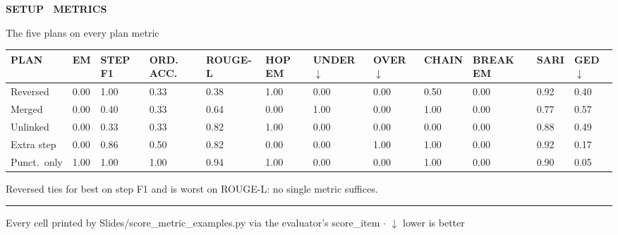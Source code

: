 \documentclass[aspectratio=169,11pt]{beamer}
\providecommand{\textls}[2][]{#2}
\newcommand{\lsp}[1]{\textls[140]{#1}}
\newcommand{\slidehead}[2]{%
  {\color{accent}\fontsize{6.8}{8}\selectfont\bfseries\lsp{#1}\par}%
  \vspace{2.4mm}%
  {\color{ink}\fontsize{15}{18}\selectfont #2\par}%
  \vspace{3.4mm}%
}
\newcommand{\thinrule}[1]{\noindent\textcolor{#1}{\rule{\linewidth}{0.4pt}}\par}
\newcommand{\srcline}[1]{%
  \vfill\thinrule{rulec}\vspace{1.5mm}%
  {\color{muted}\fontsize{6.6}{8}\selectfont #1\par}}
\newcommand{\calloutbg}[3]{%
  \par\vspace{2.6mm}%
  \begin{lrbox}{\cobox}%
    \begin{minipage}{\dimexpr\linewidth-9mm\relax}%
      \color{inktwo}\footnotesize #3%
    \end{minipage}%
  \end{lrbox}%
  \noindent{\setlength{\fboxsep}{0pt}%
    \colorbox{#1}{\raisebox{0pt}[\dimexpr\ht\cobox+2.2mm\relax][\dimexpr\dp\cobox+2.2mm\relax]{\rule{1.6pt}{0pt}}}%
    \colorbox{#2}{\raisebox{0pt}[\dimexpr\ht\cobox+2.2mm\relax][\dimexpr\dp\cobox+2.2mm\relax]{\hspace{3mm}\usebox{\cobox}\hspace{3mm}}}}%
  \par\vspace{2.6mm}%
}
\newcommand{\callout}[1]{\calloutbg{accent}{sunk}{#1}}
\newcommand{\colhead}[1]{{\color{accent}\fontsize{6.5}{8}\selectfont\bfseries\lsp{#1}}}
\begin{document}
\begin{frame}[t]
\slidehead{SETUP \textperiodcentered\ METRICS}{The five plans on every plan metric}
\footnotesize
{\setlength{\tabcolsep}{2pt}%
\begin{tabular}{@{}p{20mm}*{3}{R{9.4mm}}R{11mm}*{7}{R{9.4mm}}@{}}
\colhead{PLAN} & \colhead{EM} & \colhead{STEP F1} & \colhead{ORD. ACC.} & \colhead{\mbox{ROUGE-L}}
 & \colhead{HOP EM} & \colhead{UNDER $\downarrow$} & \colhead{OVER $\downarrow$} & \colhead{CHAIN}
 & \colhead{BREAK EM} & \colhead{SARI} & \colhead{GED $\downarrow$}\\
\midrule
Reversed & \textcolor{inktwo}{0.00} & \textcolor{inktwo}{1.00} & \textcolor{inktwo}{0.33} & \textcolor{inktwo}{0.38} & \textcolor{inktwo}{1.00} & \textcolor{inktwo}{0.00} & \textcolor{inktwo}{0.00} & \textcolor{inktwo}{0.50} & \textcolor{inktwo}{0.00} & \textcolor{inktwo}{0.92} & \textcolor{inktwo}{0.40}\\
Merged & \textcolor{inktwo}{0.00} & \textcolor{inktwo}{0.40} & \textcolor{inktwo}{0.33} & \textcolor{inktwo}{0.64} & \textcolor{inktwo}{0.00} & \textcolor{inktwo}{1.00} & \textcolor{inktwo}{0.00} & \textcolor{inktwo}{1.00} & \textcolor{inktwo}{0.00} & \textcolor{inktwo}{0.77} & \textcolor{inktwo}{0.57}\\
Unlinked & \textcolor{inktwo}{0.00} & \textcolor{inktwo}{0.33} & \textcolor{inktwo}{0.33} & \textcolor{inktwo}{0.82} & \textcolor{inktwo}{1.00} & \textcolor{inktwo}{0.00} & \textcolor{inktwo}{0.00} & \textcolor{inktwo}{0.00} & \textcolor{inktwo}{0.00} & \textcolor{inktwo}{0.88} & \textcolor{inktwo}{0.49}\\
Extra step & \textcolor{inktwo}{0.00} & \textcolor{inktwo}{0.86} & \textcolor{inktwo}{0.50} & \textcolor{inktwo}{0.82} & \textcolor{inktwo}{0.00} & \textcolor{inktwo}{0.00} & \textcolor{inktwo}{1.00} & \textcolor{inktwo}{1.00} & \textcolor{inktwo}{0.00} & \textcolor{inktwo}{0.92} & \textcolor{inktwo}{0.17}\\
Punct.\ only & \textcolor{inktwo}{1.00} & \textcolor{inktwo}{1.00} & \textcolor{inktwo}{1.00} & \textcolor{inktwo}{0.94} & \textcolor{inktwo}{1.00} & \textcolor{inktwo}{0.00} & \textcolor{inktwo}{0.00} & \textcolor{inktwo}{1.00} & \textcolor{inktwo}{0.00} & \textcolor{inktwo}{0.90} & \textcolor{inktwo}{0.05}\\
\bottomrule
\end{tabular}}
\callout{Reversed ties for best on step F1 and is worst on ROUGE-L: no single metric suffices.}
\srcline{Every cell printed by Slides/score\_metric\_examples.py via the evaluator's score\_item $\cdot$ $\downarrow$ lower is better}
\end{frame}
\end{document}
